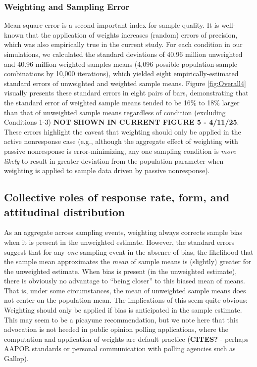 \documentclass[
  man,mask]{apa7}
\begin{document}
\subsubsection{Weighting and Sampling Error}\label{weighting-and-sampling-error}

Mean square error is a second important index for sample quality. It is well-known that the application of weights increases (random) errors of precision, which was also empirically true in the current study. For each condition in our simulations, we calculated the standard deviations of 40.96 million unweighted and 40.96 million weighted samples means (4,096 possible population-sample combinations by 10,000 iterations), which yielded eight empirically-estimated standard errors of unweighted and weighted sample means. Figure \ref{fig:Overall4} visually presents these standard errors in eight pairs of bars, demonstrating that the standard error of weighted sample means tended to be 16\% to 18\% larger than that of unweighted sample means regardless of condition (excluding Conditions 1-3) \textbf{NOT SHOWN IN CURRENT FIGURE 5 - 4/11/25}. These errors highlight the caveat that weighting should only be applied in the active nonresponse case (e.g., although the aggregate effect of weighting with passive nonresponse is error-minimizing, any one sampling condition is \emph{more likely} to result in greater deviation from the population parameter when weighting is applied to sample data driven by passive nonresponse).

\subsection{Collective roles of response rate, form, and attitudinal distribution}\label{collective-roles-of-response-rate-form-and-attitudinal-distribution}

As an aggregate across sampling events, weighting always corrects sample bias when it is present in the unweighted estimate. However, the standard errors suggest that for any \emph{one} sampling event in the absence of bias, the likelihood that the sample mean approximates the \emph{mean} of sample means is (slightly) greater for the unweighted estimate. When bias is present (in the unweighted estimate), there is obviously no advantage to ``being closer'' to this biased mean of means. That is, under some circumstances, the mean of unweighted sample means does not center on the population mean. The implications of this seem quite obvious: Weighting should only be applied if bias is anticipated in the sample estimate. This may seem to be a picayune recommendation, but we note here that this advocation is not heeded in public opinion polling applications, where the computation and application of weights are default practice (\textbf{CITES?} - perhaps AAPOR standards or personal communication with polling agencies such as Gallop).
\end{document}
